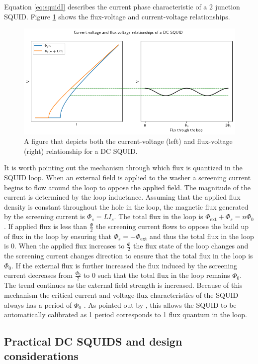 Equation \ref{eq:squidI} describes the current phase characteristic of a 2 junction SQUID. Figure \ref{fig:cv} shows the flux-voltage and current-voltage relationships. 
\begin{figure}[H]
    \centering
    \includegraphics[width=0.7\linewidth]{cvfv}
    \caption{A figure that depicts both the current-voltage (left) and flux-voltage (right) relationship for a DC SQUID. }
    \label{fig:cv}
\end{figure}
It is worth pointing out the mechanism through which flux is quantized in the SQUID loop. When an external field is applied to the washer a screening current begins to flow around the loop to oppose the applied field. The magnitude of the current is determined by the loop inductance. Assuming that the applied flux density is constant throughout the hole in the loop, the magnetic flux generated by the screening current is $\Phi_s = LI_s$. The total flux in the loop is $\Phi_{\text{ext}} + \Phi_{s} = n\Phi_0$. If applied flux is less than $\frac{\Phi}{2}$ the screening current flows to oppose the build up of flux in the loop by ensuring that $\Phi_s = -\Phi_{\text{ext}}$ and thus the total flux in the loop is 0. When the applied flux increases to $\frac{\Phi}{2}$ the flux state of the loop changes and the screening current changes direction \cite{Drung2016NBSQUIDS} to ensure that the total flux in the loop is $\Phi_0$. If the external flux is further increased the flux induced by the screening current decreases from $\frac{\Phi_0}{2}$ to $0$ such that the total flux in the loop remains $\Phi_0$. The trend continues as the external field strength is increased. Because of this mechanism the critical current and voltage-flux characteristics of the SQUID always has a period of $\Phi_0$ \cite{SQUIDhandbook}. As pointed out by \cite{Drung2016NBSQUIDS}, this allows the SQUID to be automatically calibrated as 1 period corresponds to 1 flux quantum in the loop.

\subsection{Practical DC SQUIDS and design considerations}


